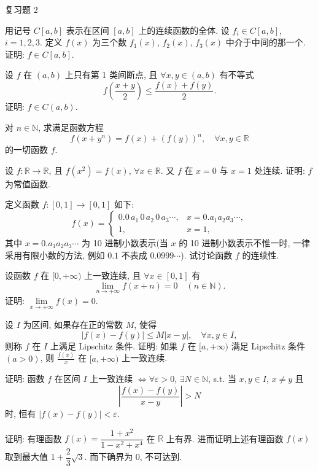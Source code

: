 \begin{exblock}{复习题 2}
    \item 用记号 $C[a,b]$ 表示在区间 $[a,b]$ 上的连续函数的全体. 设 $f_i \in C[a,b]$, $i = 1, 2, 3$. 定义 $f(x)$ 为三个数 $f_1(x)$, $f_2(x)$, $f_3(x)$ 中介于中间的那一个. 证明: $f \in C[a,b]$.

    \item 设 $f$ 在 $(a,b)$ 上只有第 1 类间断点, 且 $\forall x, y \in (a,b)$ 有不等式
    \[
    f\left(\frac{x+y}{2}\right) \leqslant \frac{f(x) + f(y)}{2}.
\]
    证明: $f \in C(a,b)$.

    \item 对 $n \in \mathbb{N}$, 求满足函数方程
    \[
    f(x + y^n) = f(x) + (f(y))^n,\quad \forall x, y \in \mathbb{R}
\]
    的一切函数 $f$.

    \item 设 $f: \mathbb{R} \to \mathbb{R}$, 且 $f(x^2) = f(x)$, $\forall x \in \mathbb{R}$. 又 $f$ 在 $x = 0$ 与 $x = 1$ 处连续. 证明: $f$ 为常值函数.

    \item 定义函数 $f: [0,1] \to [0,1]$ 如下:
    \[
    f(x) = \begin{cases}
    0.0\, a_1\, 0\, a_2\, 0\, a_3 \cdots, & x = 0.a_1 a_2 a_3 \cdots,\\
    1, & x = 1,
\end{cases}
\]
    其中 $x = 0.a_1 a_2 a_3 \cdots$ 为 10 进制小数表示(当 $x$ 的 10 进制小数表示不惟一时, 一律采用有限小数的方法, 例如 $0.1$ 不表成 $0.0999\cdots$). 试讨论函数 $f$ 的连续性.

    \item 设函数 $f$ 在 $[0,+\infty)$ 上一致连续, 且 $\forall x \in [0,1]$ 有
    \[
    \lim_{n\to+\infty} f(x + n) = 0 \quad (n \in \mathbb{N}).
\]
    证明: $\lim\limits_{x\to+\infty} f(x) = 0$.

    \item 设 $I$ 为区间, 如果存在正的常数 $M$, 使得
    \[
    |f(x) - f(y)| \leqslant M|x - y|,\quad \forall x, y \in I,
\]
    则称 $f$ 在 $I$ 上满足 Lipschitz 条件. 证明: 如果 $f$ 在 $[a,+\infty)$ 满足 Lipschitz 条件 $(a > 0)$, 则 $\frac{f(x)}{x}$ 在 $[a,+\infty)$ 上一致连续.

    \item 证明: 函数 $f$ 在区间 $I$ 上一致连续 $\iff \forall \varepsilon > 0$, $\exists N \in \mathbb{N}$, s.t. 当 $x, y \in I$, $x \neq y$ 且
    \[
    \left|\frac{f(x) - f(y)}{x - y}\right| > N
\]
    时, 恒有 $|f(x) - f(y)| < \varepsilon$.

    \item 证明: 有理函数 $f(x) = \dfrac{1 + x^2}{1 - x^2 + x^4}$ 在 $\mathbb{R}$ 上有界. 进而证明上述有理函数 $f(x)$ 取到最大值 $1 + \dfrac{2}{3}\sqrt{3}$. 而下确界为 $0$, 不可达到.


\end{exblock}
